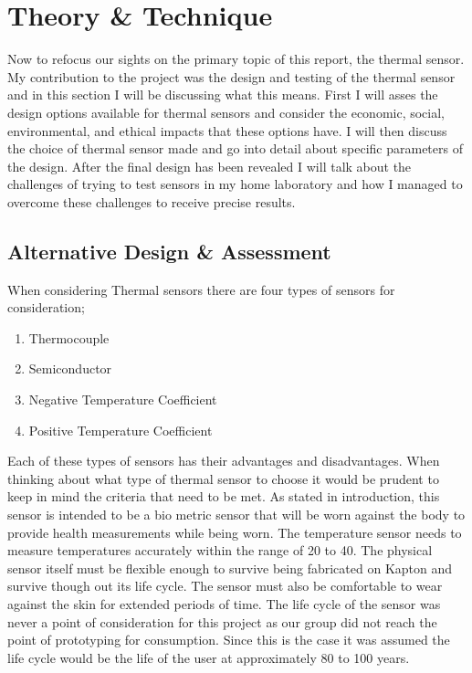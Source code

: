 \documentclass[12pt,a4paper]{report}
\begin{document}
\newpage
\section{Theory \& Technique}
Now to refocus our sights on the primary topic of this report, the thermal sensor. My contribution to the project was the design and testing of the thermal sensor and in this section I will be discussing what this means. First I will asses the design options available for thermal sensors and consider the economic, social, environmental, and ethical impacts that these options have. I will then discuss the choice of thermal sensor made and go into detail about specific parameters of the design. After the final design has been revealed I will talk about the challenges of trying to test sensors in my home laboratory and how I managed to overcome these challenges to receive precise results.


\subsection{Alternative Design \& Assessment}

When considering Thermal sensors there are four types of sensors for consideration;
\renewcommand{\theenumi}{\Alph{enumi}}
\begin{enumerate}
    \item Thermocouple
    \item Semiconductor
    \item Negative Temperature Coefficient
    \item Positive Temperature Coefficient
\end{enumerate}

Each of these types of sensors has their advantages and disadvantages. When thinking about what type of thermal sensor to choose it would be prudent to keep in mind the criteria that need to be met. As stated in introduction, this sensor is intended to be a bio metric sensor that will be worn against the body to provide health measurements while being worn. The temperature sensor needs to measure temperatures accurately within the range of 20\textcelsius{} to 40\textcelsius{}. The physical sensor itself must be flexible enough to survive being fabricated on Kapton and survive though out its life cycle. The sensor must also be comfortable to wear against the skin for extended periods of time. The life cycle of the sensor was never a point of consideration for this project as our group did not reach the point of prototyping for consumption. Since this is the case it was assumed the life cycle would be the life of the user at approximately 80 to 100 years.\par
\end{document}
